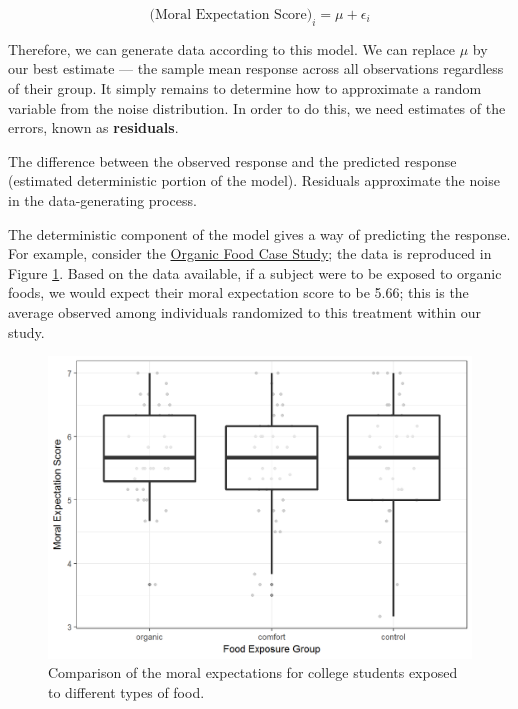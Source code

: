 \documentclass[]{book}
\theoremstyle{definition}
\theoremstyle{definition}
\theoremstyle{remark}
\let\BeginKnitrBlock\begin \let\EndKnitrBlock\end
\begin{document}
\begin{equation}
  \text{(Moral Expectation Score)}_i = \mu + \epsilon_i
  \label{eq:null-model}
\end{equation}

Therefore, we can generate data according to this model. We can replace
\(\mu\) by our best estimate --- the sample mean response across all
observations regardless of their group. It simply remains to determine
how to approximate a random variable from the noise distribution. In
order to do this, we need estimates of the errors, known as
\textbf{residuals}.

\BeginKnitrBlock{definition}[Residual]
\protect\hypertarget{def:defn-residual}{}{\label{def:defn-residual}
{} }The difference between the observed response
and the predicted response (estimated deterministic portion of the
model). Residuals approximate the noise in the data-generating process.
\EndKnitrBlock{definition}

The deterministic component of the model gives a way of predicting the
response. For example, consider the
\protect\hyperlink{CaseOrganic}{Organic Food Case Study}; the data is
reproduced in Figure \ref{fig:anovamodel-organic-boxplot}. Based on the
data available, if a subject were to be exposed to organic foods, we
would expect their moral expectation score to be 5.66; this is the
average observed among individuals randomized to this treatment within
our study.

\begin{figure}

{\centering \includegraphics[width=0.8\linewidth]{./Images/anovamodel-organic-boxplot-1} 

}

\caption{Comparison of the moral expectations for college students exposed to different types of food.}\label{fig:anovamodel-organic-boxplot}
\end{figure}
\end{document}

